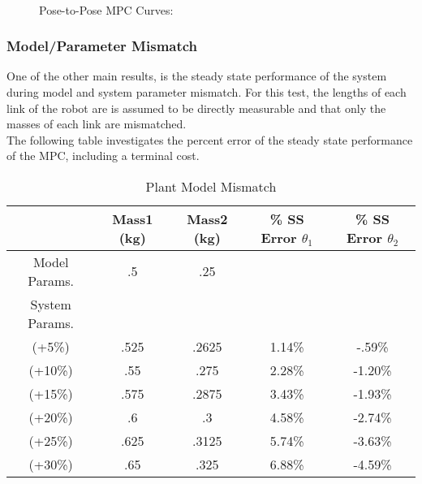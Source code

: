 \documentclass[journal]{IEEEtran}
\begin{document}
\begin{figure}[ht]%
    \centering
    \\
    \caption{Pose-to-Pose MPC Curves:}%
    \label{fig:pose2pose_control_action}%
\end{figure}


\subsubsection{Model/Parameter Mismatch}



One of the other main results, is the steady state performance of the system during model and system parameter mismatch. For this test, the lengths of each link of the robot are is assumed to be directly measurable and that only the masses of each link are mismatched.\\

The following table investigates the percent error of the steady state performance of the MPC, including a terminal cost.\\

\begin{table}[ht]\caption{Plant Model Mismatch}
    \centering
    \begin{tabular}{c c c c c}
          & Mass1 (kg) & Mass2 (kg) & \% SS Error $\theta_1$ & \% SS Error $\theta_2$  \\
        \hline\hline

        Model Params. & .5 & .25 & &  \\
        \hline
        System Params. &  & & &  \\
        \hline
        (+5\%)  & .525 & .2625 & 1.14\% & -.59\%   \\
        (+10\%) & .55 & .275 & 2.28\% & -1.20\% \\
        (+15\%) & .575 & .2875 & 3.43\% & -1.93\% \\
        (+20\%) & .6 & .3 & 4.58\% & -2.74\% \\
        (+25\%) & .625 & .3125 & 5.74\% & -3.63\% \\
        (+30\%) & .65 & .325 & 6.88\% & -4.59\% \\ [1ex]

    \end{tabular}
    \label{table:mismatch}
\end{table}
\end{document}
